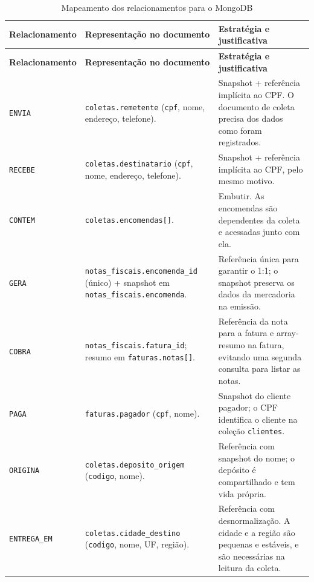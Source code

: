 {\small
\begin{longtable}{@{}L{3.0cm}L{5.6cm}L{6.4cm}@{}}
\caption{Mapeamento dos relacionamentos para o MongoDB}
\label{tab:nosql_relacionamentos}\\
\toprule
\textbf{Relacionamento} & \textbf{Representação no documento} & \textbf{Estratégia e justificativa}\\
\midrule
\endfirsthead
\toprule
\textbf{Relacionamento} & \textbf{Representação no documento} & \textbf{Estratégia e justificativa}\\
\midrule
\endhead
\bottomrule
\endfoot

\texttt{ENVIA} & \texttt{coletas.remetente} (\texttt{cpf}, nome, endereço, telefone). & Snapshot + referência implícita ao CPF. O documento de coleta precisa dos dados como foram registrados.\\

\texttt{RECEBE} & \texttt{coletas.destinatario} (\texttt{cpf}, nome, endereço, telefone). & Snapshot + referência implícita ao CPF, pelo mesmo motivo.\\

\texttt{CONTEM} & \texttt{coletas.encomendas[]}. & Embutir. As encomendas são dependentes da coleta e acessadas junto com ela.\\

\texttt{GERA} & \texttt{notas\_fiscais.encomenda\_id} (único) + snapshot em \texttt{notas\_fiscais.encomenda}. & Referência única para garantir o 1:1; o snapshot preserva os dados da mercadoria na emissão.\\

\texttt{COBRA} & \texttt{notas\_fiscais.fatura\_id}; resumo em \texttt{faturas.notas[]}. & Referência da nota para a fatura e array-resumo na fatura, evitando uma segunda consulta para listar as notas.\\

\texttt{PAGA} & \texttt{faturas.pagador} (\texttt{cpf}, nome). & Snapshot do cliente pagador; o CPF identifica o cliente na coleção \texttt{clientes}.\\

\texttt{ORIGINA} & \texttt{coletas.deposito\_origem} (\texttt{codigo}, nome). & Referência com snapshot do nome; o depósito é compartilhado e tem vida própria.\\

\texttt{ENTREGA\_EM} & \texttt{coletas.cidade\_destino} (\texttt{codigo}, nome, UF, região). & Referência com desnormalização. A cidade e a região são pequenas e estáveis, e são necessárias na leitura da coleta.\\


\end{longtable}}
